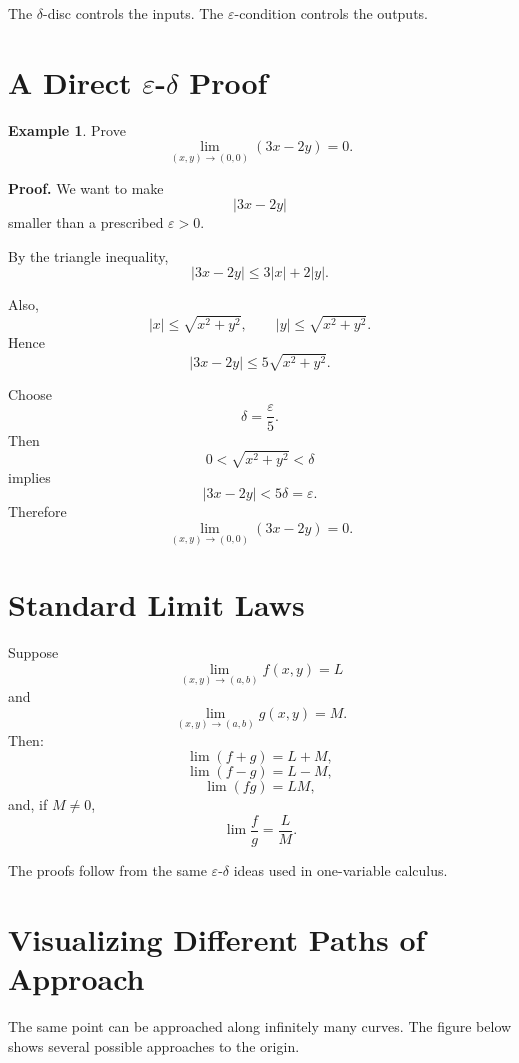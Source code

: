 \documentclass[11pt,oneside]{book}
\theoremstyle{studentthm}
\theoremstyle{definition}
\newtheorem{example}[theorem]{Example}
\newcommand{\eps}{\varepsilon}
\newcommand{\abs}[1]{\left|#1\right|}
\begin{document}
The \(\delta\)-disc controls the inputs. The \(\eps\)-condition controls
the outputs.

\section{A Direct \(\eps\)-\(\delta\) Proof}

\begin{example}
Prove
\[
\lim_{(x,y)\to(0,0)}(3x-2y)=0.
\]
\end{example}

\textbf{Proof.}
We want to make
\[
\abs{3x-2y}
\]
smaller than a prescribed \(\eps>0\).

By the triangle inequality,
\[
\abs{3x-2y}
\le3\abs{x}+2\abs{y}.
\]

Also,
\[
\abs{x}\le\sqrt{x^2+y^2},
\qquad
\abs{y}\le\sqrt{x^2+y^2}.
\]
Hence
\[
\abs{3x-2y}
\le5\sqrt{x^2+y^2}.
\]

Choose
\[
\delta=\frac{\eps}{5}.
\]
Then
\[
0<\sqrt{x^2+y^2}<\delta
\]
implies
\[
\abs{3x-2y}
<
5\delta
=
\eps.
\]
Therefore
\[
\lim_{(x,y)\to(0,0)}(3x-2y)=0.
\]

\section{Standard Limit Laws}

Suppose
\[
\lim_{(x,y)\to(a,b)}f(x,y)=L
\]
and
\[
\lim_{(x,y)\to(a,b)}g(x,y)=M.
\]
Then:
\[
\lim(f+g)=L+M,
\]
\[
\lim(f-g)=L-M,
\]
\[
\lim(fg)=LM,
\]
and, if \(M\ne0\),
\[
\lim\frac{f}{g}=\frac{L}{M}.
\]

The proofs follow from the same \(\eps\)-\(\delta\) ideas used in
one-variable calculus.


\section{Visualizing Different Paths of Approach}

The same point can be approached along infinitely many curves. The
figure below shows several possible approaches to the origin.

\begin{center}
\end{center}
\end{document}
